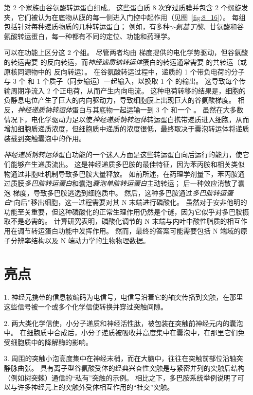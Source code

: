 第 2 个家族由谷氨酸转运蛋白组成。
这些蛋白质 8 次穿过质膜并包含 2 个螺旋发夹，它们被认为在底物从膜的每一侧进入门控中起作用（见图~\ref{fig:8_16}）。
每组包括针对每种递质物质的几种转运蛋白；
例如，有多种\textit{$\gamma$-氨基丁酸}、甘氨酸和谷氨酸转运蛋白，每一种都有不同的定位、功能和药理学。


可以在功能上区分这 2 个组。
尽管两者均由  梯度提供的电化学势驱动，但谷氨酸的转运需要  的反向转运，而\textit{神经递质钠转运体}蛋白的转运通常需要  的共转运（或原核同源物中的  反向转运）。
在谷氨酸转运过程中，递质的 1 个带负电荷的分子与 3 个  和 1 个质子（同步输运）一起输入，以换取 1 个  的输出。
这导致每个传输周期净流入 2 个正电荷，从而产生内向电流。
这种电荷转移的结果是，细胞的负静息电位产生了巨大的内向驱动力，导致细胞膜上出现巨大的谷氨酸梯度。
相反，\textit{神经递质钠转运体}蛋白与其底物一起运输一到 3 个  和一个 。
虽然在大多数情况下，电化学驱动力足以使\textit{神经递质钠转运体}转运蛋白携带递质进入细胞，从而增加细胞质递质浓度，但细胞质中递质的浓度很低，最终取决于囊泡转运体将递质装载到突触囊泡中的作用。


\textit{神经递质钠转运体}蛋白功能的一个迷人方面是这些转运蛋白向后运行的能力，使它们能够产生递质流出。
这是神经递质多巴胺的最佳特征，因为苯丙胺和相关类似物通过非胞吐机制导致多巴胺大量释放。
如前所述，在药理学剂量下，苯丙胺通过质膜\textit{多巴胺转运蛋白}和囊泡\textit{囊泡单胺转运蛋白}主动转运；
后一种效应消散了囊泡  梯度，导致多巴胺逃逸到细胞质中。
然后，这种多巴胺通过\textit{多巴胺转运蛋白}“向后”移出细胞，这一过程需要对其 N 末端进行磷酸化。
虽然对于安非他明的功能至关重要，但这种磷酸化的正常生理作用仍然是个谜，因为它似乎对多巴胺摄取不是必需的。
计算研究表明，磷酸化调节的 N 末端与内叶中酸性脂质的相互作用在调节转运蛋白功能中发挥作用。
然而，最终的答案可能需要包括 N 端域的原子分辨率结构以及 N 端动力学的生物物理数据。



\section{亮点}

1. 神经元携带的信息被编码为电信号，电信号沿着它的轴突传播到突触，在那里这些信号被一个或多个化学信使转换并穿过突触间隙。


2. 两大类化学信使，小分子递质和神经活性肽，被包装在突触前神经元内的囊泡中。
在细胞质中合成后，小分子递质被吸收并高度集中在囊泡中，在那里它们免受细胞质中的降解酶的影响。


3. 周围的突触小泡高度集中在神经末梢，而在大脑中，往往在突触前部位沿轴突静脉曲张。
具有离子型谷氨酸受体的经典兴奋性突触是与紧密并列的突触后结构（例如树突棘）通信的“私有”突触的示例。
相比之下，多巴胺系统举例说明了可以与许多神经元上的突触外受体相互作用的“社交”突触。


